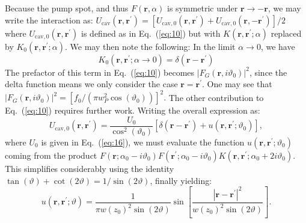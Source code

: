 \documentclass[pra,twocolumn,superscriptaddress]{revtex4-1}
\newcommand{\vect}[1]{\mathbf{#1}}
\newcommand{\pumpwidth}{w_P}
\begin{document}
Because the pump spot, and thus $F(\vect r, \alpha)$ is symmetric
under $\vect{r} \to -\vect{r}$, we may write the interaction as:
$U_{\text{cav}}(\vect r, \vect r^\prime) = [U_{\text{cav},0}(\vect r,
\vect r^\prime) + U_{\text{cav},0}(\vect r, -\vect r^\prime)]/2$ where
$U_{\text{cav},0}(\vect r, \vect r^\prime)$ is defined as in
Eq.~(\ref{eq:10}) but with $K(\vect r, \vect r^\prime; \alpha)$
replaced by $K_0(\vect r, \vect r^\prime; \alpha)$.  We may then note the
following:  In the limit $\alpha \to 0$, we have
\begin{displaymath}
  K_0(\vect r, \vect r^\prime; \alpha \to 0)
  = \delta\left( \vect r - \vect r^\prime\right)
\end{displaymath}
The prefactor of this term in Eq.~(\ref{eq:10}) becomes
$\left|F_G(\vect r, i \vartheta_0)\right|^2$, since the delta function
means we only consider the case $\vect r = \vect r^\prime$.  One may
 see that
\begin{math}
  \left|F_G(\vect r,  i \vartheta_0)\right|^2
  =
  \left[{f_0}/({\pi \pumpwidth^2 \cos(\vartheta_0)})\right]^2.
\end{math}
The other contribution to Eq.~(\ref{eq:10}) requires further work.  Writing
the overall expression as:
\begin{equation}
  U_{\text{cav},0}(\vect r, \vect r^\prime)
  = \frac{U_0}{\cos^2(\vartheta_0)} \left[
    \delta(\vect r - \vect r^\prime) 
    +
    u(\vect r,\vect r^\prime;{\vartheta_0})
  \right],
\end{equation}
where $U_0$ is given in Eq.~(\ref{eq:16}), we must evaluate the
function $u(\vect r, \vect r^\prime;{\vartheta_0})$ coming from the
product $F(\vect r; \alpha_0-i\vartheta_0) F(\vect r^\prime;
\alpha_0-i\vartheta_0) K(\vect r,\vect r^\prime;
\alpha_0+2i\vartheta_0)$.  This simplifies considerably using the
identity $\tan(\vartheta) + \cot(2 \vartheta) = 1/\sin(2\vartheta)$,
finally yielding:
\begin{displaymath}
  u(\vect r, \vect r^\prime;{\vartheta})
  =
  \frac{1}{\pi w(z_0)^2 \sin (2\vartheta)}
  \sin\left[
    \frac{|\vect r-\vect r^\prime|^2}{w(z_0)^2 \sin(2\vartheta)}
  \right].
\end{displaymath}
\end{document}
